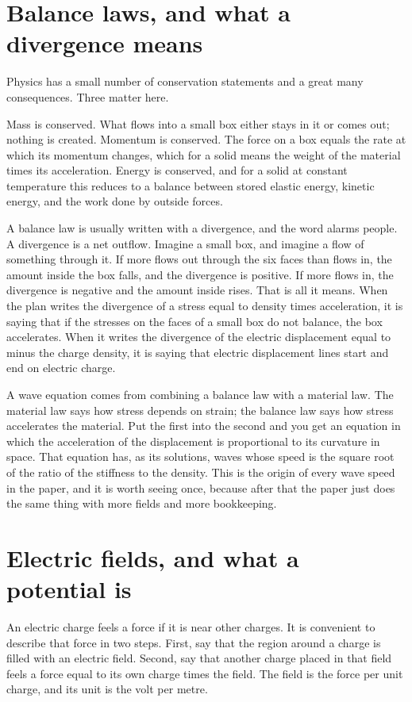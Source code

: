 \documentclass[11pt]{article}
\begin{document}
\section{Balance laws, and what a divergence means}

Physics has a small number of conservation statements and a great many consequences. Three matter here.

Mass is conserved. What flows into a small box either stays in it or comes out; nothing is created. Momentum
is conserved. The force on a box equals the rate at which its momentum changes, which for a solid means the
weight of the material times its acceleration. Energy is conserved, and for a solid at constant temperature
this reduces to a balance between stored elastic energy, kinetic energy, and the work done by outside forces.

A balance law is usually written with a divergence, and the word alarms people. A divergence is a net
outflow. Imagine a small box, and imagine a flow of something through it. If more flows out through the six
faces than flows in, the amount inside the box falls, and the divergence is positive. If more flows in, the
divergence is negative and the amount inside rises. That is all it means. When the plan writes the divergence
of a stress equal to density times acceleration, it is saying that if the stresses on the faces of a small
box do not balance, the box accelerates. When it writes the divergence of the electric displacement equal to
minus the charge density, it is saying that electric displacement lines start and end on electric charge.

A wave equation comes from combining a balance law with a material law. The material law says how stress
depends on strain; the balance law says how stress accelerates the material. Put the first into the second
and you get an equation in which the acceleration of the displacement is proportional to its curvature in
space. That equation has, as its solutions, waves whose speed is the square root of the ratio of the
stiffness to the density. This is the origin of every wave speed in the paper, and it is worth seeing once,
because after that the paper just does the same thing with more fields and more bookkeeping.

\section{Electric fields, and what a potential is}

An electric charge feels a force if it is near other charges. It is convenient to describe that force in two
steps. First, say that the region around a charge is filled with an electric field. Second, say that another
charge placed in that field feels a force equal to its own charge times the field. The field is the force per
unit charge, and its unit is the volt per metre.
\end{document}
